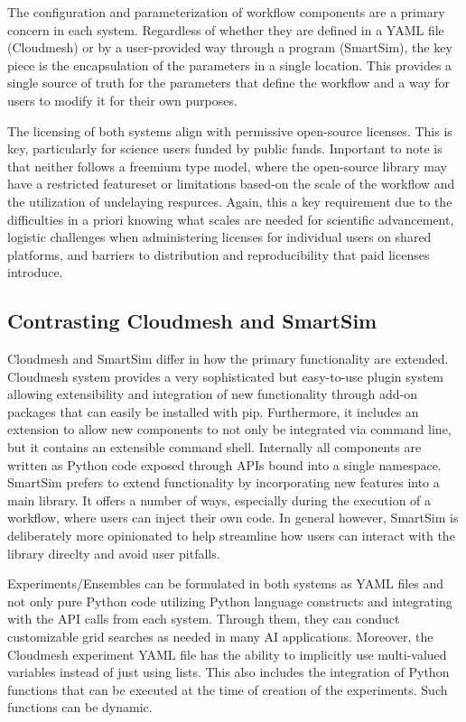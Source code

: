 \documentclass[sigconf]{acmart}
\begin{document}
The configuration and parameterization of workflow components are a primary concern in each system. Regardless of whether they are defined in a YAML file (Cloudmesh) or by a user-provided way through a program (SmartSim), the key piece is the encapsulation of the parameters in a single location. This provides a single source of truth for the parameters that define the workflow and a way for users to modify it for their own purposes. 

The licensing of both systems align with permissive open-source licenses. This is key, particularly for science users funded by public funds. Important to note is that neither follows a freemium type model, where the open-source library may have a restricted featureset or limitations based-on the scale of the workflow and the utilization of undelaying respurces. Again, this a key requirement due to the difficulties in a priori knowing what scales are needed for scientific advancement, logistic challenges when administering licenses for individual users on shared platforms, and barriers to distribution and reproducibility that paid licenses introduce.

\subsection{Contrasting Cloudmesh and SmartSim}

Cloudmesh and SmartSim differ in how the primary functionality are extended. Cloudmesh system provides a very sophisticated but easy-to-use plugin system allowing extensibility and integration of new functionality through add-on packages that can easily be installed with pip. Furthermore, it includes an extension to allow new components to not only be integrated via command line, but it contains an extensible command shell. Internally all components are written as Python code exposed through APIs bound into a single namespace. SmartSim prefers to extend functionality by incorporating new features into a main library. It offers a number of ways, especially during the execution of a workflow, where users can inject their own code. In general however, SmartSim is deliberately more opinionated to help streamline how users can interact with the library direclty and avoid user pitfalls.

Experiments/Ensembles can be formulated in both systems as YAML files and not only pure Python code utilizing Python language constructs and integrating with the API calls from each system. Through them, they can conduct customizable grid searches as needed in many AI applications. Moreover, the Cloudmesh experiment YAML file has the ability to implicitly use multi-valued variables instead of just using lists. This also includes the integration of Python functions that can be executed at the time of creation of the experiments. Such functions can be dynamic.
\end{document}
